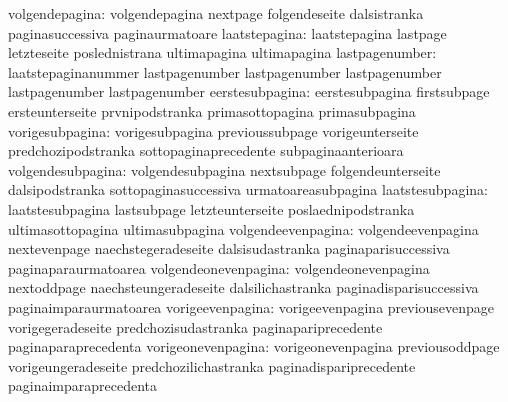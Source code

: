            volgendepagina: volgendepagina            nextpage
                           folgendeseite             dalsistranka
                           paginasuccessiva          paginaurmatoare
            laatstepagina: laatstepagina             lastpage
                           letzteseite               poslednistrana
                           ultimapagina              ultimapagina
           lastpagenumber: laatstepaginanummer       lastpagenumber
                           lastpagenumber            lastpagenumber
                           lastpagenumber            lastpagenumber
          eerstesubpagina: eerstesubpagina           firstsubpage
                           ersteunterseite           prvnipodstranka
                           primasottopagina          primasubpagina
          vorigesubpagina: vorigesubpagina           previoussubpage
                           vorigeunterseite          predchozipodstranka
                           sottopaginaprecedente     subpaginaanterioara
        volgendesubpagina: volgendesubpagina         nextsubpage
                           folgendeunterseite        dalsipodstranka
                           sottopaginasuccessiva     urmatoareasubpagina
         laatstesubpagina: laatstesubpagina          lastsubpage
                           letzteunterseite          poslaednipodstranka
                           ultimasottopagina         ultimasubpagina
       volgendeevenpagina: volgendeevenpagina        nextevenpage
                           naechstegeradeseite       dalsisudastranka
                           paginaparisuccessiva      paginaparaurmatoarea
     volgendeonevenpagina: volgendeonevenpagina      nextoddpage
                           naechsteungeradeseite     dalsilichastranka
                           paginadisparisuccessiva   paginaimparaurmatoarea
         vorigeevenpagina: vorigeevenpagina          previousevenpage
                           vorigegeradeseite         predchozisudastranka
                           paginapariprecedente      paginaparaprecedenta
       vorigeonevenpagina: vorigeonevenpagina        previousoddpage
                           vorigeungeradeseite       predchozilichastranka
                           paginadispariprecedente   paginaimparaprecedenta

